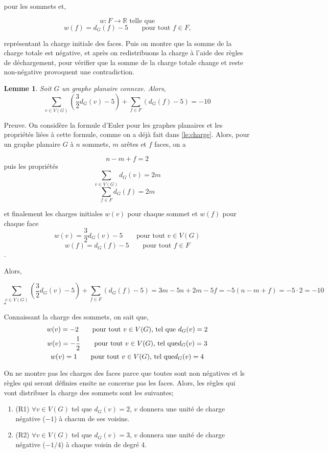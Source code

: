 \documentclass[10pt,a4paper]{article}
\newtheorem{lemme}{Lemme}
\newcommand{\ep}{{\hfill $\square$}}
\begin{document}
pour les sommets et,

$$w: F \to \mathbb{R} \textrm{ telle que} $$
 $$w(f) = d_G(f) - 5 \qquad \textrm{pour tout $f\in F$,}$$
 
représentant la charge initiale des faces. Puis on montre que la somme de la charge totale est négative, et après on redistribuons la charge à l'aide des règles de déchargement, pour vérifier que la somme de la charge totale change et reste non-négative provoquent une contradiction.

\begin{lemme}
Soit $G$ un graphe planaire connexe. Alors,
$$ \sum_{v \in V(G)} (\frac{3}{2} d_G(v) - 5) + \sum_{f\in F} (d_G(f) -5) = -10$$
\label{le:cha2}
\end{lemme}

Preuve.
On considère la formule d'Euler pour les graphes planaires et les propriétés liées à cette formule, comme on a déjà fait dans \ref{le:charge}. Alors, pour un graphe planaire $G$ à $n$ sommets, $m$ arêtes et $f$ faces, on a

$$ n - m + f = 2 $$
puis les propriétés
$$ \sum_{v\in V(G)} d_G(v) = 2m$$
$$ \sum_{f\in F} d_G(f) = 2m$$

et finalement les charges initiales $w(v)$ pour chaque sommet et $w(f)$ pour chaque face
$$ w(v) = \frac{3}{2}d_G(v) - 5 \qquad \textrm{pour tout $v \in V(G)$}$$
$$ w(f) = d_G(f) - 5 \qquad \textrm{pour tout $f \in F$}$$.

Alors,

$$ \sum_{v \in V(G)} (\frac{3}{2}d_G(v) - 5) + \sum_{f\in F} (d_G(f) -5) = 3m -5n + 2m - 5f = -5(n - m + f) = -5 \cdot 2 = -10$$
\ep 

Connaissant la charge des sommets, on sait que,
$$
\gathered
w(v) = -2 \qquad \textrm{pour tout $v \in V(G)$, tel que } d_G(v) = 2\\
w(v) = -\frac{1}{2} \qquad \textrm{pour tout $v \in V(G)$, tel que} d_G(v) = 3\\
w(v) =  1 \qquad \textrm{pour tout $v \in V(G)$, tel que} d_G(v) = 4
\endgathered
$$

On ne montre pas les charges des faces parce que toutes sont non négatives et ls règles qui seront définies ensite ne concerne pas les faces. Alors, les règles qui vont distribuer la charge des sommets sont les suivantes;

\begin{enumerate}
\item (R1) $\forall v \in V(G)$ tel que $d_G(v) = 2$, $v$ donnera une unité de charge négative ($-1$) à chacun de ses voisins.
\item (R2) $\forall v \in V(G)$ tel que $d_G(v) = 3$, $v$ donnera une unité de charge négative ($-1/4$) à chaque voisin de degré 4.
\end{enumerate}
\end{document}

